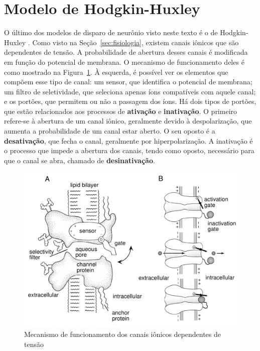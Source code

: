 \section{Modelo de Hodgkin-Huxley}\label{sec:modelohh}
O último dos modelos de disparo de neurônio visto neste texto é o de Hodgkin-Huxley \cite{hodgkin_quantitative_1952}. Como visto na Seção~\ref{sec:fisiologia}, existem canais iônicos que são dependentes de tensão. A probabilidade de abertura desses canais é modificada em função do potencial de membrana. O mecanismo de funcionamento deles é como mostrado na Figura~\ref{fig:canais}. À esquerda, é possível ver os elementos que compõem esse tipo de canal: um sensor, que identifica o potencial de membrana; um filtro de seletividade, que seleciona apenas íons compatíveis com aquele canal; e os portões, que permitem ou não a passagem dos íons. Há dois tipos de portões, que estão relacionados aos processos de \textbf{ativação} e \textbf{inativação}. O primeiro refere-se à abertura de um canal iônico, geralmente devido à despolarização, que aumenta a probabilidade de um canal estar aberto. O seu oposto é a \textbf{desativação}, que fecha o canal, geralmente por hiperpolarização. A inativação é o processo que impede a abertura dos canais, tendo como oposto, necessário para que o canal se abra, chamado de \textbf{desinativação}.
\cite{miller_introductory_2018}
\begin{figure}[htb!]
	\centering
	\caption{Mecanismo de funcionamento dos canais iônicos dependentes de tensão}
	\label{fig:canais}
	\includegraphics[width=0.6\linewidth]{figs/canais}
\end{figure}

